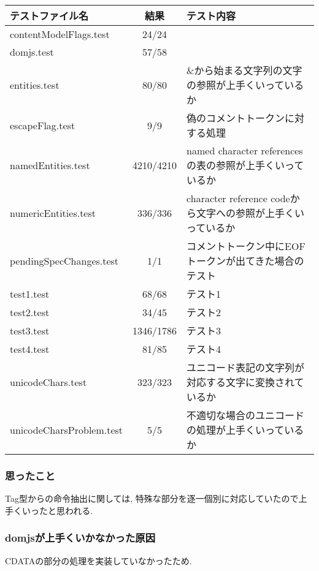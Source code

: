 \documentclass[uplatex,a4j]{jsreport}
\begin{document}
\begin{table}[htb]
  \begin{tabular}{|l|c|l|} \hline
    テストファイル名 & 結果 & テスト内容\\ \hline 
    contentModelFlags.test & 24/24 &  \\
    domjs.test & 57/58 &  \\
    entities.test & 80/80 & \&から始まる文字列の文字の参照が上手くいっているか\\
    escapeFlag.test & 9/9 & 偽のコメントトークンに対する処理\\
    namedEntities.test & 4210/4210 & named character referencesの表の参照が上手くいっているか\\
    numericEntities.test & 336/336 & character reference codeから文字への参照が上手くいっているか\\
    pendingSpecChanges.test & 1/1 & コメントトークン中にEOFトークンが出てきた場合のテスト\\
    test1.test & 68/68 & テスト1 \\
    test2.test & 34/45 & テスト2 \\
    test3.test & 1346/1786 & テスト3 \\
    test4.test & 81/85 & テスト4 \\
    unicodeChars.test & 323/323 & ユニコード表記の文字列が対応する文字に変換されているか\\
    unicodeCharsProblem.test & 5/5 & 不適切な場合のユニコードの処理が上手くいっているか\\ \hline 
  \end{tabular}
\end{table}

\subsubsection*{思ったこと}
Tag型からの命令抽出に関しては, 特殊な部分を逐一個別に対応していたので上手くいったと思われる.%
\subsubsection*{domjsが上手くいかなかった原因}
CDATAの部分の処理を実装していなかったため.
\end{document}
